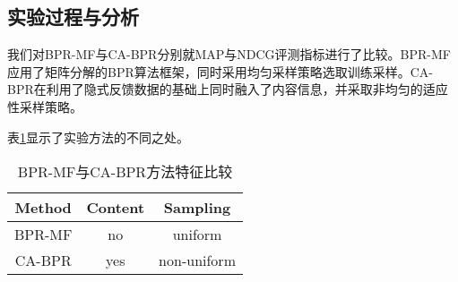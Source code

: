 \subsection{实验过程与分析}
我们对BPR-MF与CA-BPR分别就MAP与NDCG评测指标进行了比较。BPR-MF\cite{rendle2009bpr}应用了矩阵分解的BPR算法框架，同时采用均匀采样策略选取训练采样。CA-BPR\cite{DBLP:conf/webi/GuoWWT15}在利用了隐式反馈数据的基础上同时融入了内容信息，并采取非均匀的适应性采样策略。

表\ref{tab:characteristic}显示了实验方法的不同之处。
\begin{table}[htbp]
	\caption{BPR-MF与CA-BPR方法特征比较}
	\renewcommand\arraystretch{1.3}%
	\label{tab:characteristic}
	\begin{center}
		\begin{tabular}{|c|c|c|}
			\hline
			Method   &   Content & Sampling   \\
			\hline
			BPR-MF   &   no      & uniform    \\
			CA-BPR   &   yes     & non-uniform\\
			\hline
			
		\end{tabular}
	\end{center}
\end{table}

